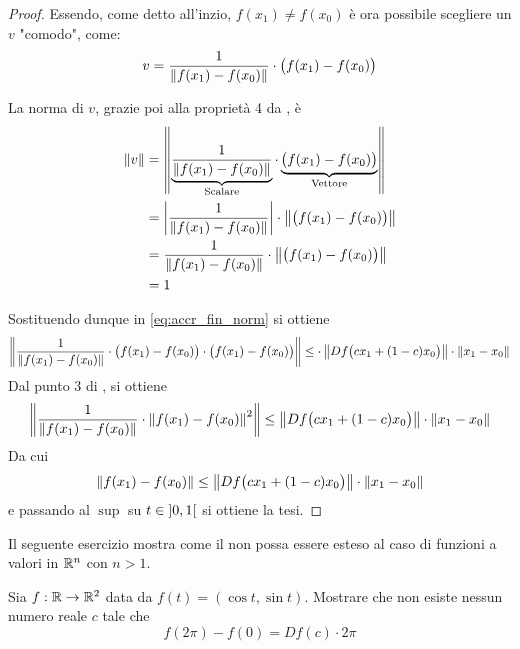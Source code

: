 \begin{theorem}
\begin{proof}
		Essendo, come detto all'inzio, $f(x_1) \neq f(x_0)$ è ora possibile scegliere un $v$ "comodo", come:
		\[v = \frac{1}{\left\|f(x_1) - f(x_0)\right\|} \cdot \bigl( f(x_1) - f(x_0) \bigr)\]
		\begin{note}
			La norma di $v$, grazie poi alla proprietà 4 da , è
			\begin{align*}
				\left\|v\right\| &= \left\|
					\underbrace{\frac{1}{\left\|f(x_1) - f(x_0)\right\|}}_{\text{Scalare}}
					\cdot
					\underbrace{\bigl( f(x_1) - f(x_0) \bigr)}_{\text{Vettore}}
					\right\|\\
				&= \left|\frac{1}{\left\|f(x_1) - f(x_0)\right\|}\right| \cdot \left\|\bigl( f(x_1) - f(x_0) \bigr)\right\|\\
				&= \frac{1}{\left\|f(x_1) - f(x_0)\right\|} \cdot \left\|\bigl( f(x_1) - f(x_0) \bigr)\right\|\\
				&= 1
			\end{align*}
		\end{note}
		Sostituendo dunque in \cref{eq:accr_fin_norm} si ottiene
		\[\left\|\frac{1}{\left\|f(x_1) - f(x_0)\right\|} \cdot \bigl( f(x_1) - f(x_0) \bigr) \cdot \bigl( f(x_1) - f(x_0) \bigr)\right\| \leq \cdot \left\|Df\bigl( cx_1 + (1-c)x_0 \bigr)\right\| \cdot \left\|x_1 - x_0\right\|\]
		Dal punto 3 di , si ottiene
		\[\left\|\frac{1}{\left\|f(x_1) - f(x_0)\right\|} \cdot \left\|f(x_1) - f(x_0)\right\|^2\right\| \leq \left\|Df\bigl( cx_1 + (1-c)x_0 \bigr)\right\| \cdot \left\|x_1 - x_0\right\|\]
		Da cui
		\[\left\|f(x_1) - f(x_0)\right\| \leq \left\|Df\bigl( cx_1 + (1-c)x_0 \bigr)\right\| \cdot \left\|x_1 - x_0\right\|\]
		e passando al $\sup$ su $t \in \left]0,1\right[$ si ottiene la tesi.
	\end{proof}
\end{theorem}
Il seguente esercizio mostra come il  non possa essere esteso al caso di funzioni a valori in $\mathbb{R}^n$ con $n > 1$.
\begin{exercise}
	Sia $f: \mathbb{R} \to \mathbb{R}^2$ data da $f(t) = (\cos t, \sin t)$. Mostrare che non esiste nessun numero reale $c$ tale che
	\[f(2 \pi) - f(0) = Df(c) \cdot 2 \pi\]
\end{exercise}

